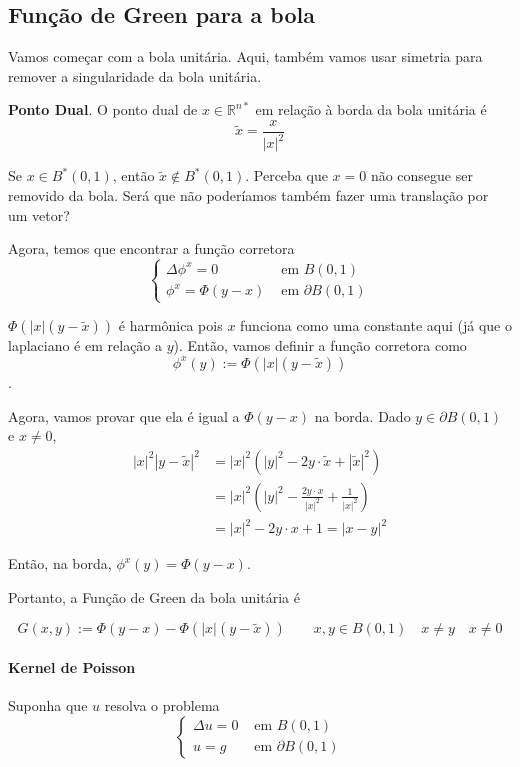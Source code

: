 \documentclass[11pt]{article}
\newcommand{\R}{\mathbb{R}}
\newcommand{\p}{\partial}
\begin{document}
\subsection{Função de Green para a bola}

Vamos começar com a bola unitária. Aqui, também vamos usar simetria para remover a singularidade da bola unitária.

\textbf{Ponto Dual}. O ponto dual de \(x \in \R^{n*}\) em relação à borda da bola unitária é \[\tilde{x} = \frac{x}{|x|^2}\]

Se \(x \in B^*(0,1)\), então \(\tilde{x} \notin B^*(0,1)\). Perceba que \(x=0\) não consegue ser removido da bola. Será que não poderíamos também fazer uma translação por um vetor?

Agora, temos que encontrar a função corretora
\[\begin{cases}
	\Delta \phi^x = 0 & \text{ em } B(0,1) \\
	\phi^x= \Phi(y-x) & \text{ em } \p B(0,1)
\end{cases}\]

\(\Phi(|x|(y-\tilde{x}))\) é harmônica pois \( x \) funciona como uma constante aqui (já que o laplaciano é em relação a \( y \)). Então, vamos definir a função corretora como \[\phi^x (y) := \Phi(|x| (y-\tilde{x}))\].

Agora, vamos provar que ela é igual a \(\Phi(y-x)\) na borda. Dado \(y \in \p B(0,1)\) e \(x\neq 0\),
\begin{align*}
	|x|^2 |y-\tilde{x}|^2 &= |x|^2 \left( |y|^2 - 2y\cdot \tilde{x} + |\tilde{x}|^2 \right) \\
	&= |x|^2 \left( |y|^2 - \frac{2y\cdot x}{|x|^2} + \frac{1}{|x|^2}\right) \\
	&= |x|^2 - 2y\cdot x +1 = |x-y|^2
\end{align*}

Então, na borda, \(\phi^x(y) = \Phi(y-x)\).

Portanto, a Função de Green da bola unitária é

\[G(x,y):=\Phi(y-x) - \Phi(|x|(y-\tilde{x})) \qquad x,y \in B(0,1) \quad  x\neq y \quad x\neq0 \]

\paragraph{Kernel de Poisson}
Suponha que \(u\) resolva o problema
\[\begin{cases}
	\Delta u = 0 & \text{ em } B(0,1) \\
	u = g & \text{ em } \p B(0,1)
\end{cases}\]
\end{document}

